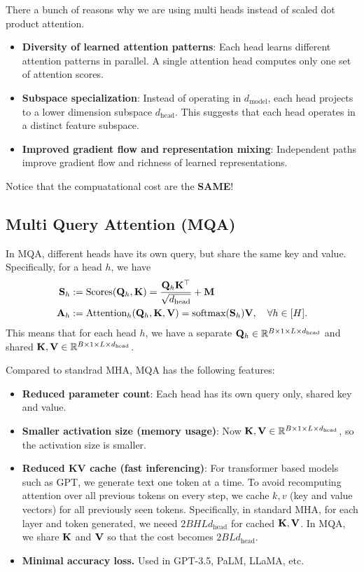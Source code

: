 \documentclass[11pt]{article}  %
\begin{document}
There a bunch of reasons why we are using multi heads instead of scaled dot product attention. 
\begin{itemize}
  \item \textbf{Diversity of learned attention patterns}: Each head learns different attention patterns in parallel. 
  A single attention head computes only one set of attention scores.

  \item \textbf{Subspace specialization}: Instead of operating in $d_{\text{model}}$, each head projects to a lower dimension subspace $d_{\text{head}}$.
  This suggests that each head operates in a distinct feature subspace.

  \item \textbf{Improved gradient flow and representation mixing}: Independent paths improve gradient flow and richness of learned representations.
\end{itemize}
Notice that the compuatational cost are the \textbf{SAME}!

\subsection{Multi Query Attention (MQA)}
In MQA, different heads have its own query, but share the same key and value.
Specifically, for a head $h$, we have 
\begin{align*}
  \mathbf{S}_h &:= \text{Scores}(\mathbf{Q}_h, \mathbf{K}) = \frac{\mathbf{Q}_h\mathbf{K}^{\top}}{\sqrt{d_{\text{head}}}} + \mathbf{M} \\
  \mathbf{A}_h &:= \text{Attention}_h (\mathbf{Q}_h, \mathbf{K}, \mathbf{V}) = \text{softmax}(\mathbf{S}_h)\mathbf{V}, \quad \forall h \in [H]. 
\end{align*}
This means that for each head $h$, we have a separate $\mathbf{Q}_h \in \mathbb{R}^{B \times 1 \times L \times d_{\text{head}}}$ and shared $\mathbf{K}, \mathbf{V} \in \mathbb{R}^{B \times 1 \times L \times d_{\text{head}}}$.

Compared to standrad MHA, MQA has the following features:
\begin{itemize}
  \item \textbf{Reduced parameter count}: Each head has its own query only, shared key and value.
  \item \textbf{Smaller activation size (memory usage)}: Now $\mathbf{K}, \mathbf{V} \in \mathbb{R}^{B \times 1 \times L \times d_{\text{head}}}$, so the activation size is smaller.
  \item \textbf{Reduced KV cache (fast inferencing)}: For transformer based models such as GPT, we generate text one token at a time. 
  To avoid recomputing attention over all previous tokens on every step, we cache $k, v$ (key and value vectors) for all previously seen tokens.
  Specifically, in standard MHA, for each layer and token generated, we neeed $2BHLd_{\text{head}}$ for cached $\mathbf{K}, \mathbf{V}$.
  In MQA, we share $\mathbf{K}$ and $\mathbf{V}$ so that the cost becomes $2BLd_{\text{head}}$.
  \item \textbf{Minimal accuracy loss.} Used in GPT-3.5, PaLM, LLaMA, etc.
\end{itemize}
\end{document}
